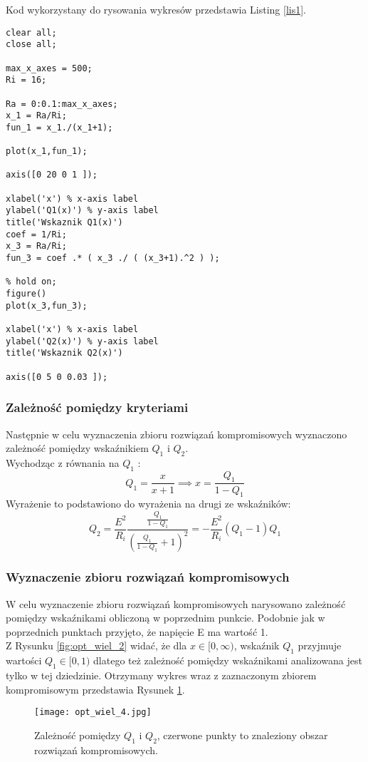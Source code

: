 \documentclass[a4paper,15pt]{article}
\begin{document}
Kod wykorzystany do rysowania wykresów przedstawia Listing \ref{lis1}.
\begin{lstlisting}[caption=Kryteria jakości, captionpos=b,label=lis1, firstnumber=1,frame=single]
clear all;
close all;

max_x_axes = 500;
Ri = 16;

Ra = 0:0.1:max_x_axes;
x_1 = Ra/Ri;
fun_1 = x_1./(x_1+1);

plot(x_1,fun_1);

axis([0 20 0 1 ]);

xlabel('x') % x-axis label
ylabel('Q1(x)') % y-axis label
title('Wskaznik Q1(x)')
coef = 1/Ri;
x_3 = Ra/Ri;
fun_3 = coef .* ( x_3 ./ ( (x_3+1).^2 ) );

% hold on;
figure()
plot(x_3,fun_3);

xlabel('x') % x-axis label
ylabel('Q2(x)') % y-axis label
title('Wskaznik Q2(x)')

axis([0 5 0 0.03 ]);
\end{lstlisting}

\subsubsection{Zależność pomiędzy kryteriami}
Następnie w celu wyznaczenia zbioru rozwiązań kompromisowych wyznaczono zależność pomiędzy wskaźnikiem \( Q_{1} \) i \( Q_{2} \). \\
Wychodząc z równania na \( Q_{1} \) : \\
\begin{equation*}
Q_{1} = \frac{x}{x+1} \implies x = \frac{Q_{1}}{1-Q_{1}}
\end{equation*}
Wyrażenie to podstawiono do wyrażenia na drugi ze wskaźników: \\
\begin{equation*}
Q_{2} = \frac{E^{2}}{R_{i}}\frac{ \frac{Q_{1}}{1-Q_{1}}  }{ ( \frac{Q_{1}}{1-Q_{1}} + 1 ) ^{2} } = -\frac{E^{2}}{R_{i}}(Q_{1}-1)Q_{1}
\end{equation*}
\subsubsection{Wyznaczenie zbioru rozwiązań kompromisowych}
W celu wyznaczenie zbioru rozwiązań kompromisowych narysowano zależność pomiędzy wskaźnikami obliczoną w poprzednim punkcie. Podobnie jak w poprzednich punktach przyjęto, że napięcie E ma wartość 1. \\
Z Rysunku \ref{fig:opt_wiel_2} widać, że dla \( x \in [0, \infty) \), wskaźnik \(Q_{1}\) przyjmuje wartości \( Q_{1} \in [0,1) \) dlatego też zależność pomiędzy wskaźnikami analizowana jest tylko w tej dziedzinie. 
Otrzymany wykres wraz z zaznaczonym zbiorem kompromisowym przedstawia Rysunek \ref{fig:opt_wiel_4}. 
\begin{figure}[H]
\centerline{\texttt{[image: opt\_wiel\_4.jpg]}}
\centering
\caption{Zależność pomiędzy \(Q_{1}\) i \(Q_{2}\), czerwone punkty to znaleziony obszar rozwiązań kompromisowych. }
\label{fig:opt_wiel_4}
\end{figure}
\end{document}

